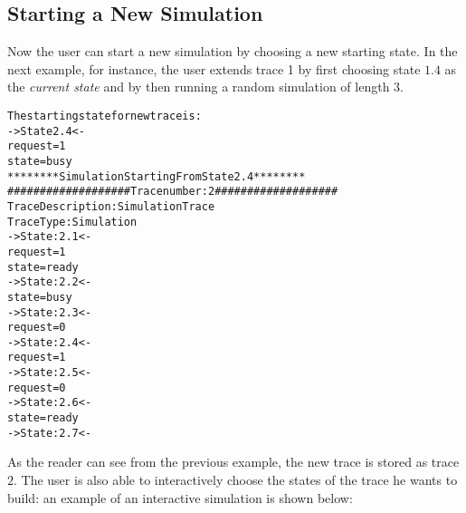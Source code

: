 \subsection{Starting a New Simulation}
\label{Starting a New Simulation}
Now the user can start a new simulation by choosing a new starting state.
In the next example, for instance, the user extends trace 1 by first
choosing state $1.4$ as the \emph{current state} and by then running a random simulation
of length $3$.
\begin{alltt}
\nusmvprompt {}
The starting state for new trace is:
-> State 2.4 <-
    request = 1
    state = busy
\nusmvprompt {}
********  Simulation Starting From State  2.4  ********
\nusmvprompt {}
################### Trace number: 2 ###################
Trace Description: Simulation Trace
Trace Type: Simulation
-> State: 2.1 <-
    request = 1
    state = ready
-> State: 2.2 <-
    state = busy
-> State: 2.3 <-
    request = 0
-> State: 2.4 <-
    request = 1
-> State: 2.5 <-
    request = 0
-> State: 2.6 <-
    state = ready
-> State: 2.7 <-
\nusmvprompt
\end{alltt}
As the reader can see from the previous example, the new trace is
stored as trace $2$.
The user is also able to interactively choose the states of the trace he wants to build:
an example of an interactive simulation is shown below:
